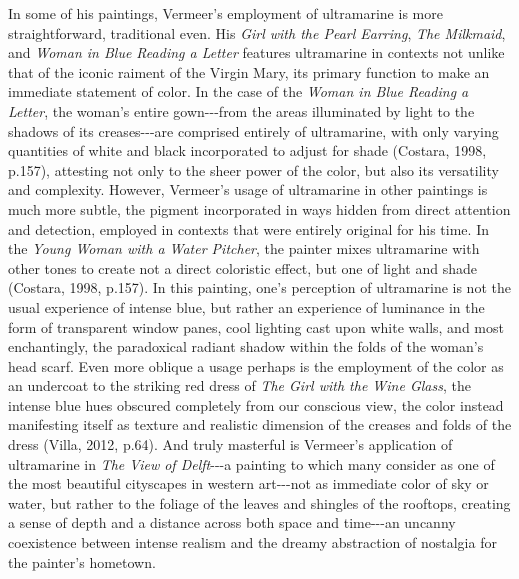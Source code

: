 In some of his paintings, Vermeer's employment of ultramarine is more
straightforward, traditional even. His \emph{Girl with the Pearl
Earring}, \emph{The Milkmaid}, and \emph{Woman in Blue Reading a Letter}
features ultramarine in contexts not unlike that of the iconic raiment
of the Virgin Mary, its primary function to make an immediate statement
of color. In the case of the \emph{Woman in Blue Reading a Letter}, the
woman's entire gown-\/-\/-from the areas illuminated by light to the
shadows of its creases-\/-\/-are comprised entirely of ultramarine, with
only varying quantities of white and black incorporated to adjust for
shade (Costara, 1998, p.157), attesting not only to the sheer power of
the color, but also its versatility and complexity. However, Vermeer's
usage of ultramarine in other paintings is much more subtle, the pigment
incorporated in ways hidden from direct attention and detection,
employed in contexts that were entirely original for his time. In the
\emph{Young Woman with a Water Pitcher}, the painter mixes ultramarine
with other tones to create not a direct coloristic effect, but one of
light and shade (Costara, 1998, p.157). In this painting, one's
perception of ultramarine is not the usual experience of intense blue,
but rather an experience of luminance in the form of transparent window
panes, cool lighting cast upon white walls, and most enchantingly, the
paradoxical radiant shadow within the folds of the woman's head scarf.
Even more oblique a usage perhaps is the employment of the color as an
undercoat to the striking red dress of \emph{The Girl with the Wine
Glass}, the intense blue hues obscured completely from our conscious
view, the color instead manifesting itself as texture and realistic
dimension of the creases and folds of the dress (Villa, 2012, p.64). And
truly masterful is Vermeer's application of ultramarine in \emph{The
View of Delft}-\/-\/-a painting to which many consider as one of the
most beautiful cityscapes in western art-\/-\/-not as immediate color of
sky or water, but rather to the foliage of the leaves and shingles of
the rooftops, creating a sense of depth and a distance across both space
and time-\/-\/-an uncanny coexistence between intense realism and the
dreamy abstraction of nostalgia for the painter's hometown.

